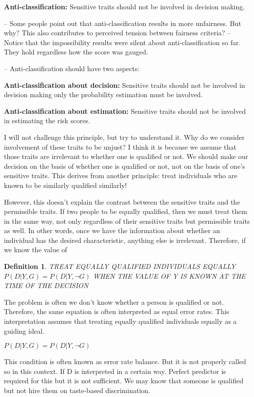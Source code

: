 \documentclass{article}
\newtheorem{definition}{Definition}
\begin{document}
 \textbf{Anti-classification:} Sensitive traits should not be involved in decision making. 

-- Some people point out that anti-classification results in more unfairness. But why? This also contributes to perceived tension between fairness criteria? 
-- Notice that the impossibility results were silent about anti-classification so far. They hold regardless how the score was gauged. 

-- Anti-classification should have two aspects:

\textbf{Anti-classification about decision:} Sensitive traits should not be involved in decision making only the probability estimation must be involved.

\textbf{Anti-classification about estimation:} Sensitive traits should not be involved in estimating the risk scores. 

I will not challenge this principle, but try to understand it. Why do we consider involvement of these traits to be unjust? I think it is because we assume that those traits are irrelevant to whether one is qualified or not. We should make our decision on the basis of whether one is qualified or not, not on the basis of one's sensitive traits. This derives from another principle: treat individuals who are known to be similarly qualified similarly!

However, this doesn't explain the contrast between the sensitive traits and the permissible traits. If two people to be equally qualified, then we must treat them in the same way, not only regardless of their sensitive traits but permissible traits as well. In other words, once we have the information about whether an individual has the desired characteristic, anything else is irrelevant. Therefore, if we know the value of 


\begin{definition}
  TREAT EQUALLY QUALIFIED INDIVIDUALS EQUALLY 
$ P(D|Y, G) =  P(D|Y, \neg G)$ WHEN THE VALUE OF Y IS KNOWN AT THE TIME OF THE DECISION
\end{definition}

The problem is often we don't know whether a person is qualified or not. Therefore, the same equation is often interpreted as equal error rates. This interpretation assumes that treating equally qualified individuals equally as a guiding ideal. 

$ P(D|Y, G) =  P(D|Y, \neg G)$

This condition is often known as error rate balance. But it is not properly called so in this context. If D is interpreted in a certain way. Perfect predictor is required for this but it is not sufficient. We may know that someone is qualified but not hire them on taste-based discrimination. 
\end{document}
